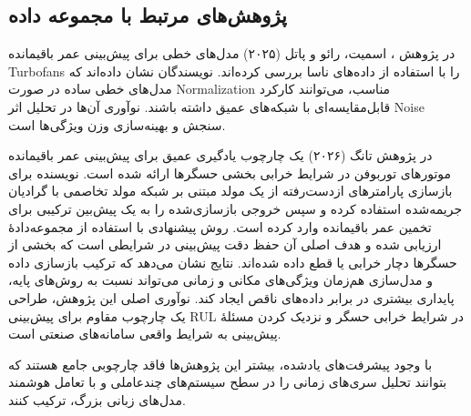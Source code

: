 \documentclass[a4paper,fleqn]{report}
\begin{document}
\subsection{پژوهش‌های مرتبط با مجموعه داده }

در پژوهش
 \cite{smith2025cmapsslinear}،
اسمیت، رائو و پاتل (۲۰۲۵)
    مدل‌های خطی برای پیش‌بینی عمر باقیمانده 
    \glspl{Turbofan}
     را با استفاده از داده‌های 
	  ناسا بررسی کرده‌اند. نویسندگان نشان داده‌اند که مدل‌های خطی ساده در صورت \gls{Normalization} مناسب، می‌توانند کارکرد قابل‌مقایسه‌ای با شبکه‌های عمیق داشته باشند. نوآوری آن‌ها در تحلیل اثر \gls{Noise} سنجش و بهینه‌سازی وزن ویژگی‌ها است.

	

در پژوهش
تانگ (۲۰۲۶)
\cite{tang2026sensorfailure}
یک چارچوب یادگیری عمیق برای پیش‌بینی عمر باقیمانده موتورهای توربوفن در شرایط خرابی بخشی حسگرها ارائه شده است. نویسنده برای بازسازی پارامترهای ازدست‌رفته از یک مولد مبتنی بر شبکه مولد تخاصمی با گرادیان جریمه‌شده استفاده کرده و سپس خروجی بازسازی‌شده را به یک پیش‌بین ترکیبی
برای تخمین عمر باقیمانده وارد کرده است. روش پیشنهادی با استفاده از مجموعه‌دادهٔ  ارزیابی شده و هدف اصلی آن حفظ دقت پیش‌بینی در شرایطی است که بخشی از حسگرها دچار خرابی یا قطع داده شده‌اند. نتایج نشان می‌دهد که ترکیب بازسازی داده و مدل‌سازی هم‌زمان ویژگی‌های مکانی و زمانی می‌تواند نسبت به روش‌های پایه، پایداری بیشتری در برابر داده‌های ناقص ایجاد کند. نوآوری اصلی این پژوهش، طراحی یک چارچوب مقاوم برای پیش‌بینی \gls{RUL} در شرایط خرابی حسگر و نزدیک کردن مسئلهٔ پیش‌بینی به شرایط واقعی سامانه‌های صنعتی است.




با وجود پیشرفت‌های یادشده، بیشتر این پژوهش‌ها فاقد چارچوبی جامع هستند که بتوانند تحلیل سری‌های زمانی را در سطح سیستم‌های چندعاملی و با تعامل هوشمند مدل‌های زبانی بزرگ، ترکیب کنند.
\end{document}

